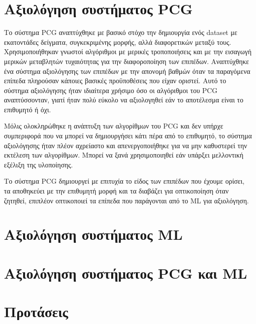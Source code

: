 \section{Αξιολόγηση συστήματος PCG}
\par
Το σύστημα PCG αναπτύχθηκε με βασικό στόχο την δημιουργία ενός dataset με εκατοντάδες δείγματα, συγκεκριμένης μορφής, αλλά διαφορετικών μεταξύ τους. Χρησιμοποιήθηκαν γνωστοί αλγόριθμοι με μερικές τροποποιήσεις και με την εισαγωγή μερικών μεταβλητών τυχαιότητας για την διαφοροποίηση των επιπέδων. Αναπτύχθηκε ένα σύστημα αξιολόγησης των επιπέδων με την απονομή βαθμών όταν τα παραγόμενα επίπεδα πληρούσαν κάποιες βασικές προϋποθέσεις που είχαν οριστεί. Αυτό το σύστημα αξιολόγησης ήταν ιδιαίτερα χρήσιμο όσο οι αλγόριθμοι του PCG αναπτύσσονταν, γιατί ήταν πολύ εύκολο να αξιολογηθεί εάν το αποτέλεσμα είναι το επιθυμητό ή όχι.
\par
Μόλις ολοκληρώθηκε η ανάπτυξη των αλγορίθμων του PCG και δεν υπήρχε συμπεριφορά που να μπορεί να δημιουργήσει κάτι πέρα από το επιθυμητό, το σύστημα αξιολόγησης ήταν πλέον αχρείαστο και απενεργοποιήθηκε για να μην καθυστερεί την εκτέλεση των αλγορίθμων. Μπορεί να ξανά χρησιμοποιηθεί εάν υπάρξει μελλοντική εξέλιξη της υλοποίησης.
\par
Το σύστημα PCG δημιουργεί με επιτυχία το είδος των επιπέδων που έχουμε ορίσει, τα αποθηκεύει με την επιθυμητή μορφή και τα διαβάζει για οπτικοποίηση όταν ζητηθεί, επιπλέον οπτικοποιεί τα επίπεδα που παράγονται από το ML για αξιολόγηση.



\section{Αξιολόγηση συστήματος ML}



\section{Αξιολόγηση συστήματος PCG και ML}



\section{Προτάσεις}